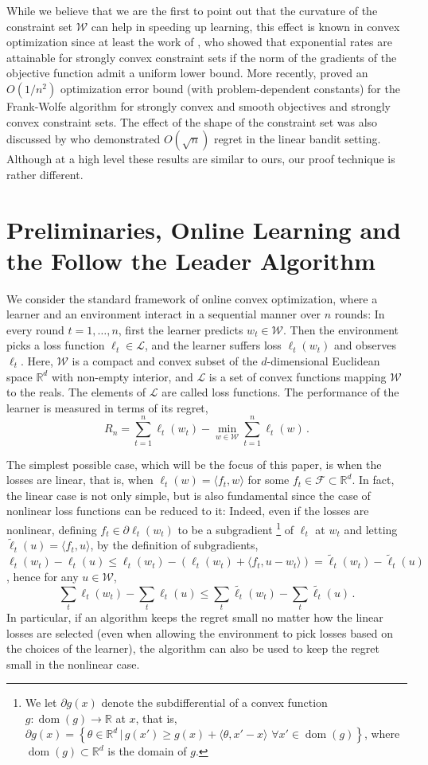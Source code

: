 \documentclass[english]{article}
\newcommand{\todoc}[2][]{\todo[color=Apricot!20,size=\tiny,#1]{C: #2}}
\newcommand{\cW}{\mathcal{W}}
\newcommand{\cF}{\mathcal{F}}
\newcommand{\cL}{\mathcal{L}}
\newcommand{\real}{\mathbb{R}}
\newcommand{\R}{\mathbb{R}}
\newcommand{\ip}[1]{\langle#1\rangle}
\newcommand{\set}[2]{\left\{#1 \,\vert\, #2 \right\}}
\newcommand{\lt}{\ell_t}
\DeclareMathOperator{\dom}{dom}
\begin{document}
While we believe that we are the first to point out that the curvature of the constraint set $\cW$ can help in speeding up learning,
this effect is known in convex optimization since at least the work of  \citet{LePo66},
who showed that exponential rates are attainable for strongly convex constraint sets if the norm of the gradients of the objective function admit a uniform lower bound. \todoc{Longer version: This is their Theorem 6.1, part (5).}
More recently, \citet{garber2014faster} 
proved an $O(1/n^2)$ optimization error bound (with problem-dependent constants) for the Frank-Wolfe algorithm for strongly convex and smooth objectives and strongly convex constraint sets.
The effect of the shape of the constraint set was also discussed by \citet{abbasi2010forced} who demonstrated $O(\sqrt{n})$ regret in the linear bandit setting.
Although at a high level these results are similar to ours, our proof technique is rather different.


\section{Preliminaries, Online Learning and the Follow the Leader Algorithm}
\label{sec:notation}
We consider the standard framework of online convex optimization, where a learner and an environment interact in a sequential manner over $n$ rounds: 
In every round $t=1,\ldots,n$, first the learner predicts $w_t\in \cW$. Then the environment picks a loss function $\ell_t\in \cL$, and the learner suffers loss $\ell_t(w_t)$ and observes $\ell_t$. 
Here, $\cW$ is a compact and convex subset of the $d$-dimensional Euclidean space $\real^d$
with non-empty interior, 
and $\cL$ is a set of convex functions mapping $\cW$ to the reals.
 The elements of $\cL$ are called loss functions.
The performance of the learner is measured in terms of its regret,
\[
R_n = \sum_{t=1}^n \lt(w_t) - \min_{w\in \cW}\sum_{t=1}^n \lt(w)\,.
\]
 
The simplest possible case, which will be the focus of this paper,
is when the losses are linear, that is, when $\lt(w) = \ip{f_t,w}$ for some $f_t\in \cF\subset \real^d$.
\newcommand{\tlt}{\tilde{\ell}_t}
In fact, the linear case is not only simple, but is also fundamental since the case of nonlinear loss functions can be reduced to it: Indeed, even if the losses are nonlinear, 
defining $f_t \in \partial \lt(w_t)$ to be a subgradient%
\footnote{
We let $\partial g(x)$ denote the subdifferential of a convex function $g:\dom(g) \to \R$ at $x$,
that is, $\partial g(x) = \set{\theta\in \R^d}{g(x') \ge g(x) + \ip{\theta, x'-x} \,\, \forall x'\in \dom(g) }$,
where $\dom(g)\subset \R^d$ is the domain of $g$.
} 
of $\lt$ at $w_t$ and  letting $\tlt(u) = \ip{f_t,u}$, by the definition of subgradients,
$\lt(w_t)-\lt(u) \le \lt(w_t)-(\lt(w_t)+\ip{f_t,u-w_t}) = \tlt(w_t)-\tlt(u)$, hence for any $u\in \cW$,
\[
\sum_t \lt(w_t) - \sum_t \lt(u) \le \sum_t \tilde{\lt}(w_t) - \sum_t \tilde{\lt}(u)\,.
\]
In particular, if an algorithm keeps the regret small no matter how the linear losses are selected
(even when allowing the environment to pick losses based on the choices of the learner), 
the algorithm can also be used to keep the regret small in the nonlinear case. 
\end{document}
